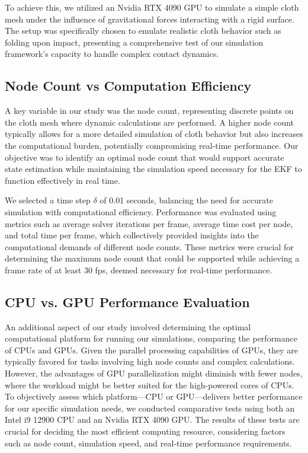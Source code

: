 \documentclass[subscriptcorrection,upint,varvw,barcolor=Goldenrod3,mathalfa=cal=euler,balance,hyphenate,french,pdf-a, nofoot]{asmejour} %
\begin{document}
To achieve this, we utilized an Nvidia RTX 4090 GPU to simulate a simple cloth mesh under the influence of gravitational forces interacting with a rigid surface. The setup was specifically chosen to emulate realistic cloth behavior such as folding upon impact, presenting a comprehensive test of our simulation framework's capacity to handle complex contact dynamics.

\subsection{Node Count vs Computation Efficiency}
A key variable in our study was the node count, representing discrete points on the cloth mesh where dynamic calculations are performed. A higher node count typically allows for a more detailed simulation of cloth behavior but also increases the computational burden, potentially compromising real-time performance. Our objective was to identify an optimal node count that would support accurate state estimation while maintaining the simulation speed necessary for the EKF to function effectively in real time.

We selected a time step \(\delta\) of 0.01 seconds, balancing the need for accurate simulation with computational efficiency. Performance was evaluated using metrics such as average solver iterations per frame, average time cost per node, and total time per frame, which collectively provided insights into the computational demands of different node counts. These metrics were crucial for determining the maximum node count that could be supported while achieving a frame rate of at least 30 fps, deemed necessary for real-time performance.

\subsection{CPU vs. GPU Performance Evaluation}
An additional aspect of our study involved determining the optimal computational platform for running our simulations, comparing the performance of CPUs and GPUs. Given the parallel processing capabilities of GPUs, they are typically favored for tasks involving high node counts and complex calculations. However, the advantages of GPU parallelization might diminish with fewer nodes, where the workload might be better suited for the high-powered cores of CPUs. To objectively assess which platform—CPU or GPU—delivers better performance for our specific simulation needs, we conducted comparative tests using both an Intel i9 12900 CPU and an Nvidia RTX 4090 GPU. The results of these tests are crucial for deciding the most efficient computing resource, considering factors such as node count, simulation speed, and real-time performance requirements.
\end{document}
